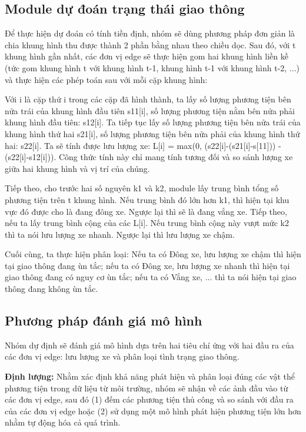 \subsection{Module dự đoán trạng thái giao thông}

\quad Để thực hiện dự đoán có tính tiền định, nhóm sẽ dùng phương pháp đơn giản là chia khung hình thu được thành 2 phần bằng nhau theo chiều dọc. Sau đó, với t khung hình gần nhất, các đơn vị edge sẽ thực hiện gom hai khung hình liền kề (tức gom khung hình t với khung hình t-1, khung hình t-1 với khung hình t-2, ...) và thực hiện các phép toán sau với mỗi cặp khung hình:

\quad Với i là cặp thứ i trong các cặp đã hình thành, ta lấy số lượng phương tiện bên nửa trái của khung hình đầu tiên s11[i], số lượng phương tiện nằm bên nửa phải khung hình đầu tiên: s12[i]. Ta tiếp tục lấy số lượng phương tiện bên nửa trái của khung hình thứ hai s21[i], số lượng phương tiện bên nửa phải của khung hình thứ hai: s22[i]. Ta sẽ tính được lưu lượng xe: L[i] = max(0, (s22[i]-(s21[i]-s[11])) - (s22[i]-s12[i])). Công thức tính này chỉ mang tính tương đối và so sánh lượng xe giữa hai khung hình và vị trí của chúng.

\quad Tiếp theo, cho trước hai số nguyên k1 và k2, module lấy trung bình tổng số phương tiện trên t khung hình. Nếu trung bình đó lớn hơn k1, thì hiện tại khu vực đó được cho là đang đông xe. Ngược lại thì sẽ là đang vắng xe. Tiếp theo, nếu ta lấy trung bình cộng của các L[i]. Nếu trung bình cộng này vượt mức k2 thì ta nói lưu lượng xe nhanh. Ngược lại thì lưu lượng xe chậm.

\quad Cuối cùng, ta thực hiện phân loại: Nếu ta có {Đông xe, lưu lượng xe chậm} thì hiện tại giao thông đang ùn tắc; nếu ta có {Đông xe, lưu lượng xe nhanh} thì hiện tại giao thông đang có nguy cơ ùn tắc; nếu ta có {Vắng xe, ...} thì ta nói hiện tại giao thông đang không ùn tắc.

\subsection{Phương pháp đánh giá mô hình}
\quad Nhóm dự định sẽ đánh giá mô hình dựa trên hai tiêu chí ứng với hai đầu ra của các đơn vị edge: lưu lượng xe và phân loại tình trạng giao thông.

\quad \textbf{Định lượng:} Nhằm xác định khả năng phát hiện và phân loại đúng các vật thể phương tiện trong dữ liệu từ môi trường, nhóm sẽ nhận về các ảnh đầu vào từ các đơn vị edge, sau đó (1) đếm các phương tiện thủ công và so sánh với đầu ra của các đơn vị edge hoặc (2) sử dụng một mô hình phát hiện phương tiện lớn hơn nhằm tự động hóa cả quá trình.

